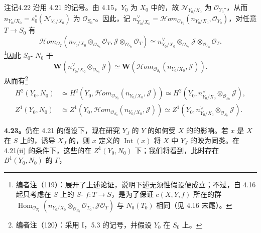 \begin{SGAresult}{注记}{4.22}
沿用 4.21 的记号。由 4.15，$Y_0$ 为 $X_0$ 中的，故 $\mathscr N_{Y_0/X_0}$ 为 $\mathscr O_{Y_0}$-，从而 $n_{Y_0/X_0}=\varepsilon_0^*(\mathscr N_{Y_0/X_0})$ 为 $\mathscr O_{S_0}$-。因此，记 $n_{Y_0/X_0}^\vee=\mathscr Hom_{\mathscr O_{Y_0}}(n_{Y_0/X_0},\mathscr O_{Y_0})$，对任意 $T\to S_0$ 有
\[\mathscr Hom_{\mathscr O_T}(n_{Y_0/X_0}\otimes_{\mathscr O_{S_0}}\mathscr O_T,\mathscr J\otimes_{\mathscr O_{S_0}}\mathscr O_T)\simeq n_{Y_0/X_0}^\vee\otimes_{\mathscr O_{S_0}}\mathscr J\otimes_{\mathscr O_{S_0}}\mathscr O_T.\]
\footnote{编者注（119）：展开了上述论证，说明下述无须性假设便成立；不过，自 4.16 起只考虑在 $S$ 上的 $S$- $f:T\to S$，是为了保证 $c(X,Y,f)$ 所在的群 $\operatorname{Hom}_{\mathscr O_{T_0}}(n_{Y_0/X_0}\otimes_{\mathscr O_{S_0}}\mathscr O_{T_0},\mathscr J\mathscr O_T)$ 与 $N_0(T_0)$ 相同（见 4.16 末尾）。}因此 $S_0$- $N_0$ 于
\[\mathbf W(n_{Y_0/X_0}^\vee\otimes_{\mathscr O_{S_0}}\mathscr J)\simeq\mathbf W(\mathscr Hom_{\mathscr O_{S_0}}(n_{Y_0/X_0},\mathscr J)).\]
从而有\footnote{编者注（120）：采用 I，5.3 的记号，并假设 $Y_0$ 在 $S_0$ 上。}
\[
\begin{aligned}
H^2(Y_0,N_0)&\simeq H^2(Y_0,\mathscr Hom_{\mathscr O_{S_0}}(n_{Y_0/X_0},\mathscr J))\simeq H^2(Y_0,n_{Y_0/X_0}^\vee\otimes_{\mathscr O_{S_0}}\mathscr J),\\
Z^1(Y_0,N_0)&\simeq Z^1(Y_0,\mathscr Hom_{\mathscr O_{S_0}}(n_{Y_0/X_0},\mathscr J))\simeq Z^1(Y_0,n_{Y_0/X_0}^\vee\otimes_{\mathscr O_{S_0}}\mathscr J).
\end{aligned}
\]
\end{SGAresult}
\textbf{4.23。}仍在 4.21 的假设下，现在研究 $Y_J$ 的 $Y$ 的如何受 $X$ 的的影响。若 $x$ 是 $X$ 在 $S$ 上的，诱导 $X_J$ 的，则 $x$ 定义的 $\operatorname{Int}(x)$ 将 $X$ 中 $Y_J$ 的映为同类。在 4.21(ii) 的条件下，这些的在 $Z^1(Y_0,N_0)$ 下；我们将看到，此时存在 $B^1(Y_0,N_0)$ 的 $\Gamma$，
